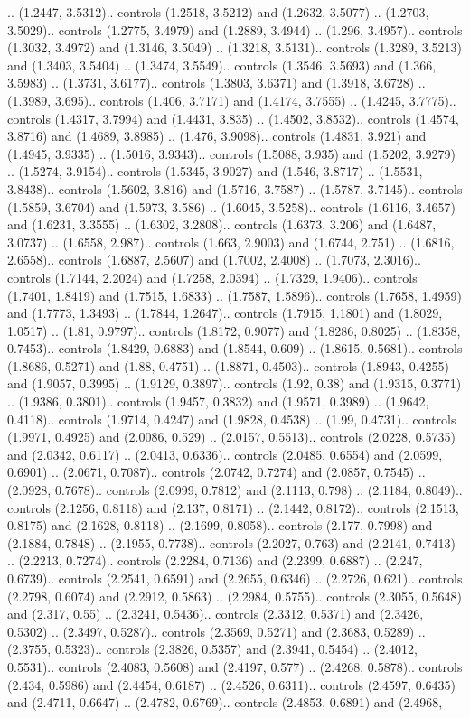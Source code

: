 .. (1.2447, 3.5312).. controls (1.2518, 3.5212) and (1.2632, 3.5077) .. (1.2703, 3.5029).. controls (1.2775, 3.4979) and (1.2889, 3.4944) .. (1.296, 3.4957).. controls (1.3032, 3.4972) and (1.3146, 3.5049) .. (1.3218, 3.5131).. controls (1.3289, 3.5213) and (1.3403, 3.5404) .. (1.3474, 3.5549).. controls (1.3546, 3.5693) and (1.366, 3.5983) .. (1.3731, 3.6177).. controls (1.3803, 3.6371) and (1.3918, 3.6728) .. (1.3989, 3.695).. controls (1.406, 3.7171) and (1.4174, 3.7555) .. (1.4245, 3.7775).. controls (1.4317, 3.7994) and (1.4431, 3.835) .. (1.4502, 3.8532).. controls (1.4574, 3.8716) and (1.4689, 3.8985) .. (1.476, 3.9098).. controls (1.4831, 3.921) and (1.4945, 3.9335) .. (1.5016, 3.9343).. controls (1.5088, 3.935) and (1.5202, 3.9279) .. (1.5274, 3.9154).. controls (1.5345, 3.9027) and (1.546, 3.8717) .. (1.5531, 3.8438).. controls (1.5602, 3.816) and (1.5716, 3.7587) .. (1.5787, 3.7145).. controls (1.5859, 3.6704) and (1.5973, 3.586) .. (1.6045, 3.5258).. controls (1.6116, 3.4657) and (1.6231, 3.3555) .. (1.6302, 3.2808).. controls (1.6373, 3.206) and (1.6487, 3.0737) .. (1.6558, 2.987).. controls (1.663, 2.9003) and (1.6744, 2.751) .. (1.6816, 2.6558).. controls (1.6887, 2.5607) and (1.7002, 2.4008) .. (1.7073, 2.3016).. controls (1.7144, 2.2024) and (1.7258, 2.0394) .. (1.7329, 1.9406).. controls (1.7401, 1.8419) and (1.7515, 1.6833) .. (1.7587, 1.5896).. controls (1.7658, 1.4959) and (1.7773, 1.3493) .. (1.7844, 1.2647).. controls (1.7915, 1.1801) and (1.8029, 1.0517) .. (1.81, 0.9797).. controls (1.8172, 0.9077) and (1.8286, 0.8025) .. (1.8358, 0.7453).. controls (1.8429, 0.6883) and (1.8544, 0.609) .. (1.8615, 0.5681).. controls (1.8686, 0.5271) and (1.88, 0.4751) .. (1.8871, 0.4503).. controls (1.8943, 0.4255) and (1.9057, 0.3995) .. (1.9129, 0.3897).. controls (1.92, 0.38) and (1.9315, 0.3771) .. (1.9386, 0.3801).. controls (1.9457, 0.3832) and (1.9571, 0.3989) .. (1.9642, 0.4118).. controls (1.9714, 0.4247) and (1.9828, 0.4538) .. (1.99, 0.4731).. controls (1.9971, 0.4925) and (2.0086, 0.529) .. (2.0157, 0.5513).. controls (2.0228, 0.5735) and (2.0342, 0.6117) .. (2.0413, 0.6336).. controls (2.0485, 0.6554) and (2.0599, 0.6901) .. (2.0671, 0.7087).. controls (2.0742, 0.7274) and (2.0857, 0.7545) .. (2.0928, 0.7678).. controls (2.0999, 0.7812) and (2.1113, 0.798) .. (2.1184, 0.8049).. controls (2.1256, 0.8118) and (2.137, 0.8171) .. (2.1442, 0.8172).. controls (2.1513, 0.8175) and (2.1628, 0.8118) .. (2.1699, 0.8058).. controls (2.177, 0.7998) and (2.1884, 0.7848) .. (2.1955, 0.7738).. controls (2.2027, 0.763) and (2.2141, 0.7413) .. (2.2213, 0.7274).. controls (2.2284, 0.7136) and (2.2399, 0.6887) .. (2.247, 0.6739).. controls (2.2541, 0.6591) and (2.2655, 0.6346) .. (2.2726, 0.621).. controls (2.2798, 0.6074) and (2.2912, 0.5863) .. (2.2984, 0.5755).. controls (2.3055, 0.5648) and (2.317, 0.55) .. (2.3241, 0.5436).. controls (2.3312, 0.5371) and (2.3426, 0.5302) .. (2.3497, 0.5287).. controls (2.3569, 0.5271) and (2.3683, 0.5289) .. (2.3755, 0.5323).. controls (2.3826, 0.5357) and (2.3941, 0.5454) .. (2.4012, 0.5531).. controls (2.4083, 0.5608) and (2.4197, 0.577) .. (2.4268, 0.5878).. controls (2.434, 0.5986) and (2.4454, 0.6187) .. (2.4526, 0.6311).. controls (2.4597, 0.6435) and (2.4711, 0.6647) .. (2.4782, 0.6769).. controls (2.4853, 0.6891) and (2.4968, 